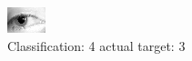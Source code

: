 \begin{figure}[h!]
\begin{center}
\includegraphics[width=0.60\columnwidth]{figures/ID1276_class_4_target_3.png}
\end{center}
\caption{ Classification: 4 actual target: 3}
\label{fig:ID1276_class_4_target_3}
\end{figure}

